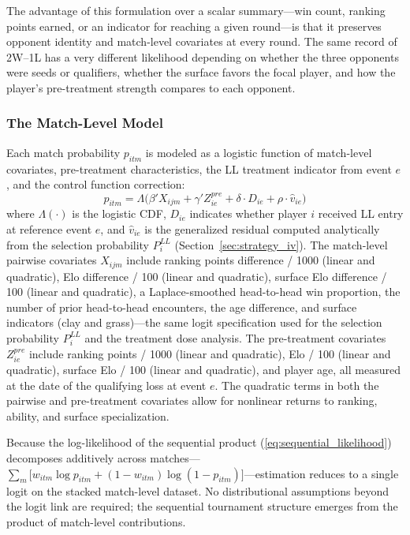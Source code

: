 The advantage of this formulation over a scalar summary---win count, ranking points earned, or an indicator for reaching a given round---is that it preserves opponent identity and match-level covariates at every round. The same record of 2W--1L has a very different likelihood depending on whether the three opponents were seeds or qualifiers, whether the surface favors the focal player, and how the player's pre-treatment strength compares to each opponent.

\subsubsection{The Match-Level Model}

Each match probability $p_{itm}$ is modeled as a logistic function of match-level covariates, pre-treatment characteristics, the LL treatment indicator from event $e$, and the control function correction:
\begin{equation}
\label{eq:match_logit}
p_{itm} = \Lambda\bigl(\beta' X_{ijm} + \gamma' Z^{pre}_{ie} + \delta \cdot D_{ie} + \rho \cdot \hat{v}_{ie}\bigr)
\end{equation}
where $\Lambda(\cdot)$ is the logistic CDF, $D_{ie}$ indicates whether player $i$ received LL entry at reference event $e$, and $\hat{v}_{ie}$ is the generalized residual computed analytically from the selection probability $P_i^{LL}$ (Section~\ref{sec:strategy_iv}). The match-level pairwise covariates $X_{ijm}$ include ranking points difference / 1000 (linear and quadratic), Elo difference / 100 (linear and quadratic), surface Elo difference / 100 (linear and quadratic), a Laplace-smoothed head-to-head win proportion, the number of prior head-to-head encounters, the age difference, and surface indicators (clay and grass)---the same logit specification used for the selection probability $P_i^{LL}$ and the treatment dose analysis. The pre-treatment covariates $Z^{pre}_{ie}$ include ranking points / 1000 (linear and quadratic), Elo / 100 (linear and quadratic), surface Elo / 100 (linear and quadratic), and player age, all measured at the date of the qualifying loss at event $e$. The quadratic terms in both the pairwise and pre-treatment covariates allow for nonlinear returns to ranking, ability, and surface specialization.

Because the log-likelihood of the sequential product (\ref{eq:sequential_likelihood}) decomposes additively across matches---$\sum_m \bigl[w_{itm} \log p_{itm} + (1 - w_{itm}) \log(1 - p_{itm})\bigr]$---estimation reduces to a single logit on the stacked match-level dataset. No distributional assumptions beyond the logit link are required; the sequential tournament structure emerges from the product of match-level contributions.

